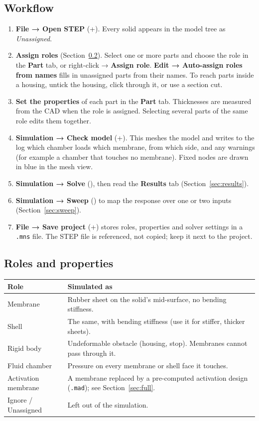 \documentclass[11pt,a4paper]{article}
\newcommand{\code}[1]{\texttt{#1}}
\newcommand{\menu}[1]{\textsf{\textbf{#1}}}
\newcommand{\key}[1]{\fbox{\footnotesize\textsf{#1}}}
\begin{document}
\subsection{Workflow}

\begin{enumerate}
\item \menu{File → Open STEP} (\key{Ctrl}+\key{O}). Every solid appears in the model tree as \emph{Unassigned}.
\item \textbf{Assign roles} (Section~\ref{sec:neuronroles}). Select one or more parts and choose the role in the
  \menu{Part} tab, or right-click → \menu{Assign role}. \menu{Edit → Auto-assign roles from names} fills in
  unassigned parts from their names. To reach parts inside a housing, untick the housing, click through it, or use a
  section cut.
\item \textbf{Set the properties} of each part in the \menu{Part} tab. Thicknesses are measured from the CAD when
  the role is assigned. Selecting several parts of the same role edits them together.
\item \menu{Simulation → Check model} (\key{Ctrl}+\key{K}). This meshes the model and writes to the log which
  chamber loads which membrane, from which side, and any warnings (for example a chamber that touches no
  membrane). Fixed nodes are drawn in blue in the mesh view.
\item \menu{Simulation → Solve} (\key{F5}), then read the \menu{Results} tab (Section~\ref{sec:results}).
\item \menu{Simulation → Sweep} (\key{F6}) to map the response over one or two inputs
  (Section~\ref{sec:sweep}).
\item \menu{File → Save project} (\key{Ctrl}+\key{S}) stores roles, properties and solver settings in a
  \code{.mns} file. The STEP file is referenced, not copied; keep it next to the project.
\end{enumerate}

\subsection{Roles and properties}
\label{sec:neuronroles}

\begin{center}
\begin{tabularx}{\textwidth}{@{}l X@{}}
\toprule
Role & Simulated as \\
\midrule
Membrane & Rubber sheet on the solid's mid-surface, no bending stiffness. \\
Shell & The same, with bending stiffness (use it for stiffer, thicker sheets). \\
Rigid body & Undeformable obstacle (housing, stop). Membranes cannot pass through it. \\
Fluid chamber & Pressure on every membrane or shell face it touches. \\
Activation membrane & A membrane replaced by a pre-computed activation design (\code{.mad}); see
  Section~\ref{sec:full}. \\
Ignore / Unassigned & Left out of the simulation. \\
\bottomrule
\end{tabularx}
\end{center}
\end{document}
